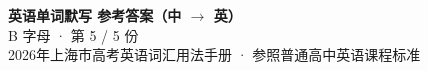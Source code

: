 \documentclass[10pt,a4paper]{article}
\begin{document}
\pagestyle{plain}

\begin{center}
{\LARGE\bfseries 英语单词默写 \quad 参考答案（中 $\to$ 英）}\\[0.22em]
{\large B 字母 · 第 5 / 5 份}\\[0.18em]
{\small 2026年上海市高考英语词汇用法手册 · 参照普通高中英语课程标准}
\end{center}

\vspace{0.2em}
\noindent{\color{rulegray}\rule{\textwidth}{0.8pt}}

\vspace{0.35em}

\vspace{0.25em}
\renewcommand{\arraystretch}{1.32}
\end{document}
